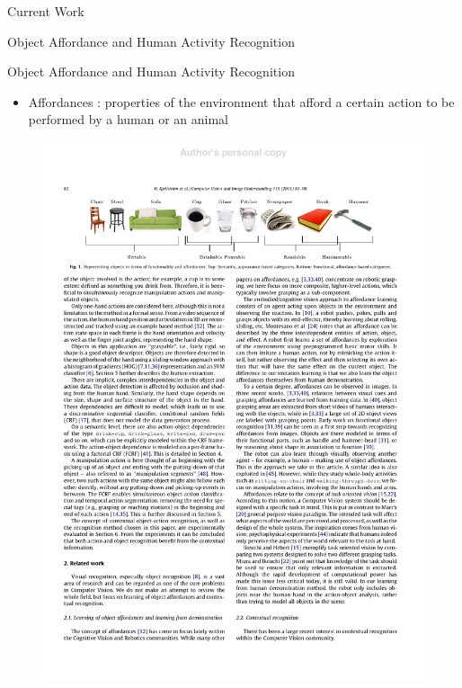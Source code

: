 \documentclass{beamer}
\begin{document}
\begin{frame}{Current Work}
\begin{center}
{\huge
Object Affordance and Human Activity Recognition
}
\end{center}
\end{frame}

\begin{frame}{ Object Affordance and Human Activity Recognition}
\begin{itemize}
\item Affordances :  properties of the environment that afford a certain action to be performed by a human or an animal
\end{itemize}
\begin{figure}[t!]
\includegraphics[width=.95\linewidth]{affordances.pdf}
\end{figure}
\end{frame}
\end{document}

